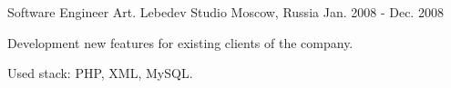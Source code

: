 \begin{cventries}
  \cventry
    {Software Engineer}
    {Art. Lebedev Studio}
    {Moscow, Russia}
    {Jan. 2008 - Dec. 2008}
    {
      \begin{cvitems}
        \item {Development new features for existing clients of the company.}
        \item {Used stack: PHP, XML, MySQL.}
      \end{cvitems}
    }

\end{cventries}
